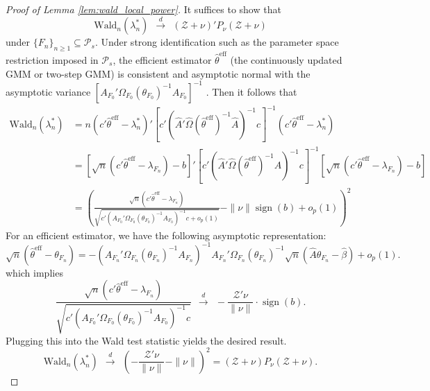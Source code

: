 \documentclass[11pt]{article}
\theoremstyle{definition}
\DeclareMathOperator*{\sign}{sign}
\newcommand{\0}{\ensuremath{\mathbf{0}}}
\begin{document}
\begin{bibunit}
%

\begin{proof}[Proof of Lemma \ref{lem:wald_local_power}]
    It suffices to show that 
    \[
        \text{Wald}_n(\lambda_n^*) ~~\xrightarrow{d}~~ (\mathcal{Z} + \nu)'P_\nu (\mathcal{Z} + \nu)
    \]
    under $\{F_n\}_{n\geq 1} \subseteq \mathcal{P}_s$. 
    Under strong identification such as the parameter space restriction imposed in $\mathcal{P}_s$, the efficient estimator $\hat{\theta}^{\text{eff}}$ (the continuously updated GMM or two-step GMM) is consistent and asymptotic normal with the asymptotic variance $\left[A_{F_0}'\Omega_{F_0}(\theta_{F_0})^{-1} A_{F_0}\right]^{-1}$ \citep[Theorem 5.2]{newey/mcfadden:1994}. Then it follows that
    \begin{align*}
        \text{Wald}_n(\lambda_n^*) 
        &= 
        n(c'\hat{\theta}^{\text{eff}} - \lambda_{n}^*)' \left[c'(\hat{A}'\hat{\Omega}(\hat{\theta}^{\text{eff}})^{-1}\hat{A})^{-1}c\right]^{-1}(c'\hat{\theta}^{\text{eff}} - \lambda_{n}^*) \\
        &=
        \left[\sqrt{n}(c'\hat{\theta}^{\text{eff}} - \lambda_{F_n}) - b\right]' \left[c'(\hat{A}'\hat{\Omega}(\hat{\theta}^{\text{eff}})^{-1}\hat{A})^{-1}c\right]^{-1}\left[\sqrt{n}(c'\hat{\theta}^{\text{eff}} - \lambda_{F_n}) - b\right] \\
        &= 
        \left(\frac{\sqrt{n}(c'\hat{\theta}^{\text{eff}} - \lambda_{F_n})}{\sqrt{c'(A_{F_0}'\Omega_{F_0}(\theta_{F_0})^{-1}A_{F_0})^{-1}c + o_p(1)}} - \|\nu\|\sign(b) + o_p(1)\right)^2
    \end{align*}
    For an efficient estimator, we have the following asymptotic representation:
    \[
        \sqrt{n}(\hat{\theta}^{\text{eff}} - \theta_{F_n}) = -(A_{F_n}'\Omega_{F_n}(\theta_{F_n})^{-1} A_{F_n})^{-1} A_{F_n}'\Omega_{F_n}(\theta_{F_n})^{-1} \sqrt{n}(\hat{A}\theta_{F_n} - \hat{\beta}) + o_p(1).
    \]
    which implies
    \[
        \frac{\sqrt{n}(c'\hat{\theta}^{\text{eff}} - \lambda_{F_n})}{\sqrt{c'(A_{F_0}'\Omega_{F_0}(\theta_{F_0})^{-1}A_{F_0})^{-1}c}} ~~\xrightarrow{d}~~ -\frac{\mathcal{Z}'\nu}{\|\nu\|} \cdot \sign(b).
    \]
    Plugging this into the Wald test statistic yields the desired result.
    \[
        \text{Wald}_n(\lambda_n^*)  ~~\xrightarrow{d}~~ \left(-\frac{\mathcal{Z}'\nu}{\|\nu\|} - \|\nu\|\right)^2 = (\mathcal{Z} + \nu) P_\nu (\mathcal{Z} + \nu).
    \]
\end{proof}


%


\end{bibunit}
\end{document}
